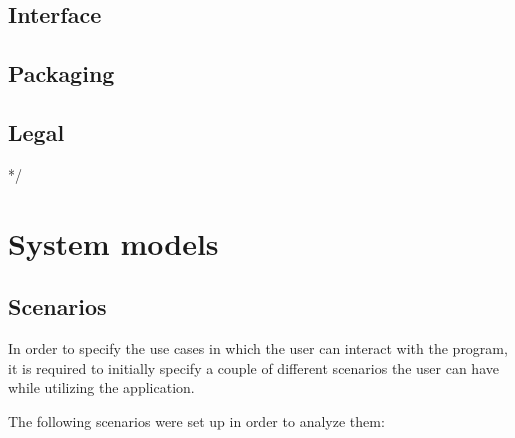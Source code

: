 \subsection{Interface}

\subsection{Packaging}

\subsection{Legal}
*/

\section{System models}

\subsection{Scenarios}
In order to specify the use cases in which the user can interact with the program, it is required to initially specify a couple of different scenarios the user can have while utilizing the application.

The following scenarios were set up in order to analyze them:

